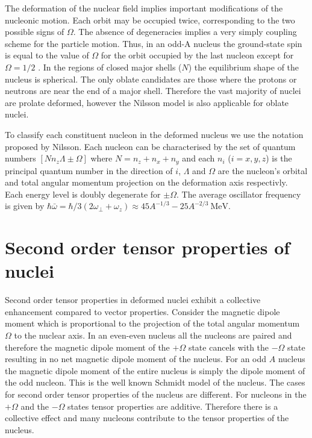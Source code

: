 \documentclass[10pt,a4paper, twoside, openright]{report}
\begin{document}
The deformation of the nuclear field implies important modifications of the nucleonic motion. Each orbit may be occupied twice, corresponding to the two possible signs of $\Omega$. The absence of degeneracies implies a very simply coupling scheme for the particle motion. Thus, in an odd-A nucleus the ground-state spin is equal to the value of $\Omega$ for the orbit occupied by the last nucleon except for $\Omega=1/2$ \cite{Nilsson1955}.  In the regions of closed major shells ($N$) the equilibrium shape of the nucleus is spherical. The only oblate candidates are those where the protons or neutrons are near the end of a major shell. Therefore the vast majority of nuclei are prolate deformed, however the Nilsson model is also applicable for oblate nuclei. 


To classify each constituent nucleon in the deformed nucleus we use the notation proposed by Nilsson\cite{Nilsson1955, BohrMottVol2}. Each nucleon can be characterised by the set of quantum numbers $\left[N n_z \Lambda \pm\Omega\right]$ \cite{BohrMottVol2}  where $N = n_z + n_x + n_y$ and each $n_i$ ($i = x, y, z$) is the principal quantum number in the direction of $i$, $\Lambda$ and $\Omega$ are the nucleon's orbital and total angular momentum projection on the deformation axis respectivly. Each energy level is doubly degenerate for $\pm\Omega$. The average oscillator frequency is given by $\hbar\bar{\omega} = \hbar/3\left(2\omega_{\perp} + \omega_z\right) \approx 45A^{-1/3} - 25A^{-2/3} \ \text{MeV}$\cite{Brown2016}. 


\section{Second order tensor properties of nuclei}

Second order tensor properties  in deformed nuclei exhibit a collective enhancement compared to vector properties. Consider the magnetic dipole moment  which is proportional to  the projection of the total angular momentum $\Omega$ to the nuclear axis. In an even-even nucleus all the nucleons are paired and therefore the magnetic dipole moment of the $+\Omega$ state cancels with the $-\Omega$ state resulting in no net magnetic dipole moment of the nucleus. For an odd $A$ nucleus  the magnetic dipole moment of the entire nucleus is simply the dipole moment of the odd nucleon. This is the well known Schmidt model of the nucleus. The cases for second order tensor properties of the nucleus are different. For  nucleons in the  $+\Omega$ and the $-\Omega$ states tensor properties  are additive. Therefore there is a collective effect and many nucleons contribute to the tensor properties of the nucleus.
\end{document}
